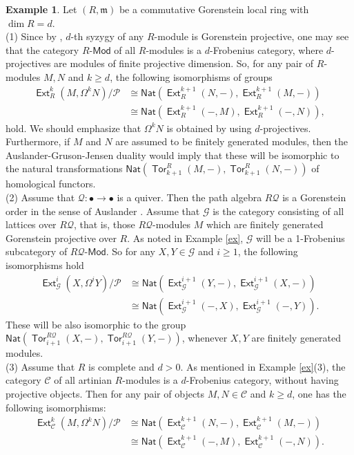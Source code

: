 \documentclass[11pt,a4paper]{amsart}
\newcommand{\lrt}{\longrightarrow}
\newcommand{\Md}{\mathsf{Mod}}
\newcommand{\Q}{\mathcal{Q} }
\newcommand{\C}{\mathscr{C} }
\newcommand{\G}{\mathcal{G} }
\newcommand{\m}{\mathfrak{m}}
\newcommand{\p}{\mathfrak{p} }
\def\Ext{\operatorname{{\mathsf{Ext}}}}
\def\Tor{\operatorname{\mathsf{Tor}}}
\def\G{\mathcal{G}}
\def\syz{\mathsf{\Omega}}
\def\p{\mathcal P}
\newcommand{\nat}{{\mathsf{Nat}}}
\theoremstyle{definition}
\newtheorem{example}[theorem]{Example}
\theoremstyle{plain}
\theoremstyle{definition}
\numberwithin{equation}{section}
\begin{document}
\begin{example}Let $(R, \m)$ be a commutative Gorenstein local ring with $\dim R=d$.\\
(1) Since by \cite[Theorem 10.2.4]{ej}, $d$-th syzygy of any $R$-module is Gorenstein projective, one may see that the category $R$-$\Md$ of all $R$-modules is a $d$-Frobenius category, where $d$-projectives are modules of finite projective dimension. So, for any pair of $R$-modules $M, N$ and $k\geq d$, the following isomorphisms of groups
\[\begin{array}{lllll}
\Ext^k_R(M, \syz^kN)/{\p} & \cong \nat(\Ext^{k+1}_R(N, -), \Ext^{k+1}_R(M, -))\\
& \cong \nat(\Ext^{k+1}_R(-, M), \Ext^{k+1}_R(-, N)),
\end{array}\]
hold. We should emphasize that $\syz^kN$ is obtained by using $d$-projectives. Furthermore, if $M$ and $N$ are assumed to be finitely generated modules, then  the Auslander-Gruson-Jensen duality would imply that these will be isomorphic to the natural transformations $\nat(\Tor_{k+1}^R(M, -), \Tor_{k+1}^R(N, -))$ of homological functors.
\\ (2)  Assume that $\Q:\bullet\lrt\bullet$ is a quiver. Then the path algebra $R\Q$ is a Gorenstein order in the sense of Auslander \cite{auslander1967functors}. Assume that $\G$ is the category consisting of all lattices over $R\Q$, that is, those $R\Q$-modules $M$ which are finitely generated Gorenstein projective over $R$. As noted in  Example \ref{ex}, $\G$ will be a 1-Frobenius subcategory of $R\Q$-$\Md$.
So for any $X, Y\in\G$ and $i\geq 1$, the following isomorphisms hold
\[\begin{array}{lllll}
\Ext^i_{\G}(X, \syz^iY)/{\p} & \cong \nat(\Ext^{i+1}_{\G}(Y, -), \Ext^{i+1}_{\G}(X, -))\\
& \cong \nat(\Ext^{i+1}_{\G}(-, X), \Ext^{i+1}_{\G}(-, Y)).
\end{array}\]
These will be also isomorphic to the group $\nat(\Tor_{i+1}^{R\Q}(X, -), \Tor_{i+1}^{R\Q}(Y, -))$, whenever $X, Y$ are finitely generated modules.\\ (3) Assume that $R$ is complete and $d>0$. As mentioned in Example \ref{ex}(3), the category $\C$ of all artinian $R$-modules is a $d$-Frobenius category, without having projective objects. Then for any pair of objects $M, N\in\C$ and $k\geq d$, one has the following isomorphisms:  
\[\begin{array}{lllll}
\Ext^k_{\C}(M, \syz^kN)/{\p} & \cong \nat(\Ext^{k+1}_{\C}(N, -), \Ext^{k+1}_{\C}(M, -))\\
& \cong \nat(\Ext^{k+1}_{\C}(-, M), \Ext^{k+1}_{\C}(-, N)).
\end{array}\]

\end{example}
\end{document}
